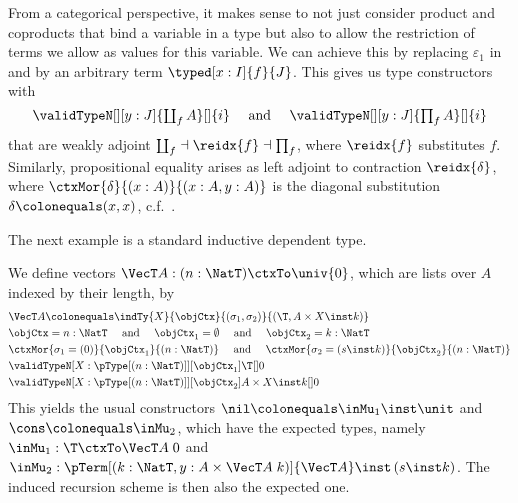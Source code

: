 \documentclass[preprint]{sigplanconf}
\begin{document}
\begin{example}
  \label{ex:general-(co)product}
  From a categorical perspective, it makes sense to not just consider product
  and coproducts that bind a variable in a type but also to allow the
  restriction of terms we allow as values for this variable.
  We can achieve this by replacing $\varepsilon_1$ in  and
   by an arbitrary term $\typed[x : I]{f}{J}$.
  This gives us type constructors with
  \begin{equation*}
    \textstyle
    \validTypeN[][y : J]{\coprod_f A}[]{i}
    \quad \text{ and } \quad
    \validTypeN[][y : J]{\prod_f A}[]{i}
  \end{equation*}
  that are weakly adjoint $\coprod_f \dashv \reidx{f} \dashv \prod_f$,
  where $\reidx{f}$ substitutes $f$.
  Similarly, propositional equality arises as left adjoint to
  contraction $\reidx{\delta}$, where
  $\ctxMor{\delta}{(x : A)}{(x : A, y : A)}$ is
  the diagonal substitution $\delta \colonequals (x, x)$,
  c.f.~\cite[Def. 10.5.1]{Jacobs1999-CLTT}.
  \qedDef
\end{example}



The next example is a standard inductive dependent type.
\begin{example}[Vectors]
  We define vectors $\VecT A : (n : \NatT) \ctxTo \univ{0}$, which are lists
  over $A$ indexed by their length, by
  \begin{align*}
    & \VecT A \colonequals
    \indTy{X}{\objCtx}{(\sigma_1, \sigma_2)}{(\T, A \times X \inst k)} \\
    & \objCtx = n : \NatT
    \quad \text{ and } \quad \objCtx_1 = \emptyset
    \quad \text{ and } \quad \objCtx_2 = k : \NatT \\
    & \ctxMor{\sigma_1 = (0)}{\objCtx_1}{(n : \NatT)}
    \quad \text{ and } \quad
    \ctxMor{\sigma_2 = (s \inst k)}{\objCtx_2}{(n : \NatT)} \\
    & \validTypeN[X : {\pType[(n : \NatT)]}][\objCtx_1]{\T}[]{0} \\
    & \validTypeN[X : {\pType[(n : \NatT)]}][\objCtx_2]
    {A \times X \inst k}[]{0}
  \end{align*}
  This yields the usual constructors $\nil \colonequals \inMu_1 \inst \unit$
  and $\cons \colonequals \inMu_2$, which have the expected types, namely
  $\inMu_1 : \T \ctxTo \VecT A \; 0$ and
  $\inMu_2 : \pTerm[(k:\NatT, y : A \times \VecT A \; k)]{\VecT A}
  \inst \, (s \inst k)$.
  The induced recursion scheme is then also the expected one.
\qedDef
\end{example}
\end{document}

